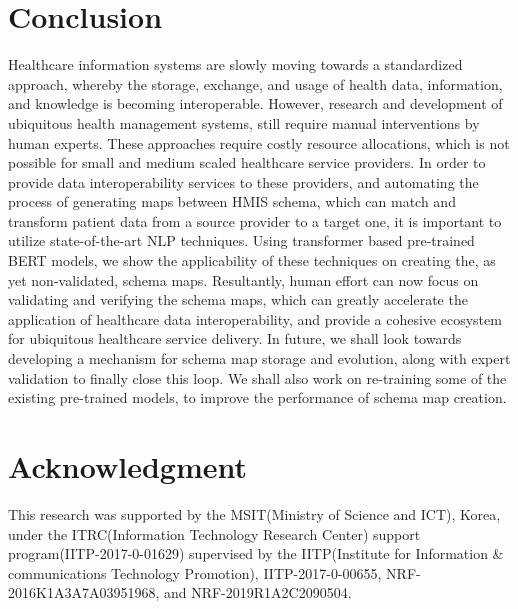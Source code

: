 \documentclass{ieeeaccess}
\begin{document}
\section{Conclusion}
\label{conclusion}
Healthcare information systems are slowly moving towards a standardized approach, whereby the storage, exchange, and usage of health data, information, and knowledge is becoming interoperable. However, research and development of ubiquitous health management systems, still require manual interventions by human experts. These approaches require costly resource allocations, which is not possible for small and medium scaled healthcare service providers. In order to provide data interoperability services to these providers, and automating the process of generating maps between HMIS schema, which can match and transform patient data from a source provider to a target one, it is important to utilize state-of-the-art NLP techniques. Using transformer based pre-trained BERT models, we show the applicability of these techniques on creating the, as yet non-validated, schema maps. Resultantly, human effort can now focus on validating and verifying the schema maps, which can greatly accelerate the application of healthcare data interoperability, and provide a cohesive ecosystem for ubiquitous healthcare service delivery.
In future, we shall look towards developing a mechanism for schema map storage and evolution, along with expert validation to finally close this loop. We shall also work on re-training some of the existing pre-trained models, to improve the performance of schema map creation.


\section*{Acknowledgment}
This research was supported by the MSIT(Ministry of Science and ICT), Korea, under the ITRC(Information Technology Research Center) support program(IITP-2017-0-01629) supervised by the IITP(Institute for Information \& communications Technology Promotion), IITP-2017-0-00655, NRF-2016K1A3A7A03951968, and NRF-2019R1A2C2090504.



\end{document}
